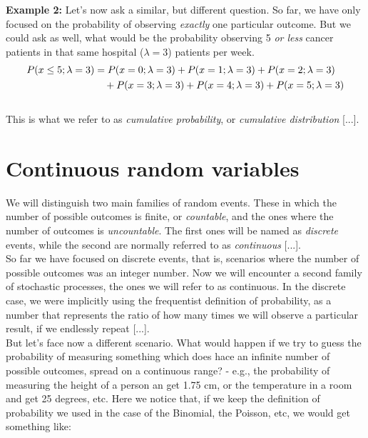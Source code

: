 \documentclass{book}
\begin{document}
\textbf{Example 2:} Let's now ask a similar, but different question. So far, we have only focused on the probability of observing \textit{exactly} one particular outcome. But we could ask as well, what would be the probability observing 5 \textit{or less} cancer patients in that same hospital ($\lambda = 3$) patients per week.
\begin{align}
    P(x \leq 5; \lambda = 3) &= P(x=0; \lambda = 3) + P(x=1; \lambda = 3) + P(x=2; \lambda = 3) \notag \\
    &\quad + P(x=3; \lambda = 3) + P(x=4; \lambda = 3) + P(x=5; \lambda = 3) \notag
\end{align}\\

This is what we refer to as \textit{cumulative probability}, or \textit{cumulative distribution} [...].
\newpage

\section{Continuous random variables}

We will distinguish two main families of random events. These in which the number of possible outcomes is finite, or \textit{countable}, and the ones where the number of outcomes is \textit{uncountable}. The first ones will be named as \textit{discrete} events, while the second are normally referred to as \textit{continuous} [...]. \\

So far we have focused on discrete events, that is, scenarios where the number of possible outcomes was an integer number. Now we will encounter a second family of stochastic processes, the ones we will refer to as continuous. In the discrete case, we were implicitly using the frequentist definition of probability, as a number that represents the ratio of how many times we will observe a particular result, if we endlessly repeat [...].\\

But let's face now a different scenario. What would happen if we try to guess the probability of measuring something which does hace an infinite number of possible outcomes, spread on a continuous range? - e.g., the probability of measuring the height of a person an get 1.75 cm, or the temperature in a room and get 25 degrees, etc. Here we notice that, if we keep the definition of probability we used in the case of the Binomial, the Poisson, etc, we would get something like:
\end{document}

